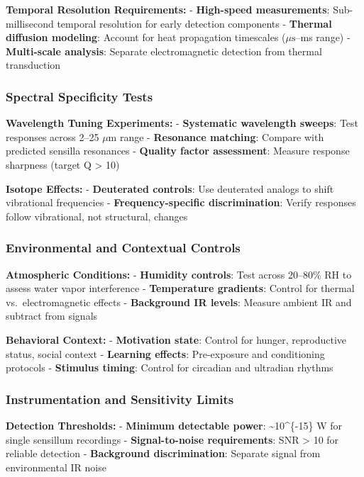 \documentclass[
  13pt,
  a4paperpaper,
  12pt]{article}
\begin{document}
\textbf{Temporal Resolution Requirements:} - \textbf{High-speed
measurements}: Sub-millisecond temporal resolution for early detection
components - \textbf{Thermal diffusion modeling}: Account for heat
propagation timescales (\(\mu\mathrm{s}\)--ms range) -
\textbf{Multi-scale analysis}: Separate electromagnetic detection from
thermal transduction

\subsubsection{Spectral Specificity
Tests}\label{spectral-specificity-tests}

\textbf{Wavelength Tuning Experiments:} - \textbf{Systematic wavelength
sweeps}: Test responses across 2--25 \(\mu\mathrm{m}\) range -
\textbf{Resonance matching}: Compare with predicted sensilla resonances
- \textbf{Quality factor assessment}: Measure response sharpness (target
Q \textgreater{} 10)

\textbf{Isotope Effects:} - \textbf{Deuterated controls}: Use deuterated
analogs to shift vibrational frequencies - \textbf{Frequency-specific
discrimination}: Verify responses follow vibrational, not structural,
changes

\subsubsection{Environmental and Contextual
Controls}\label{environmental-and-contextual-controls}

\textbf{Atmospheric Conditions:} - \textbf{Humidity controls}: Test
across 20--80\% RH to assess water vapor interference -
\textbf{Temperature gradients}: Control for thermal vs.~electromagnetic
effects - \textbf{Background IR levels}: Measure ambient IR and subtract
from signals

\textbf{Behavioral Context:} - \textbf{Motivation state}: Control for
hunger, reproductive status, social context - \textbf{Learning effects}:
Pre-exposure and conditioning protocols - \textbf{Stimulus timing}:
Control for circadian and ultradian rhythms

\subsubsection{Instrumentation and Sensitivity
Limits}\label{instrumentation-and-sensitivity-limits}

\textbf{Detection Thresholds:} - \textbf{Minimum detectable power}:
\textasciitilde10\^{}\{-15\} W for single sensillum recordings -
\textbf{Signal-to-noise requirements}: SNR \textgreater{} 10 for
reliable detection - \textbf{Background discrimination}: Separate signal
from environmental IR noise
\end{document}
